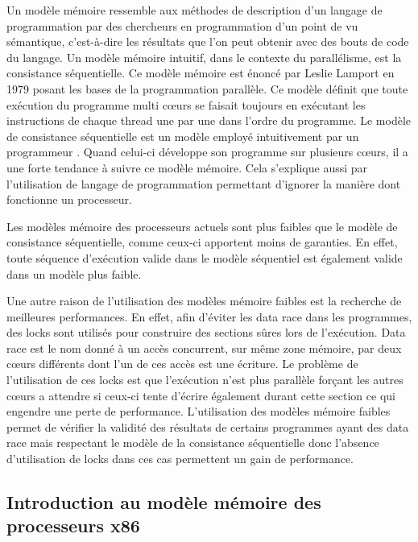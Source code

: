 \documentclass[12pt,a4paper]{article}
\begin{document}
Un modèle mémoire ressemble aux méthodes de description d'un langage de programmation par des chercheurs en programmation d'un point de vu sémantique, c'est-à-dire les résultats que l'on peut obtenir avec des bouts de code du langage. Un modèle mémoire intuitif, dans le contexte du parallélisme, est la consistance séquentielle. Ce modèle mémoire est énoncé par Leslie Lamport en 1979 posant les bases de la programmation parallèle. Ce modèle définit que toute exécution du programme multi cœurs se faisait toujours en exécutant les instructions de chaque thread une par une dans l'ordre du programme. Le modèle de consistance séquentielle est un modèle employé intuitivement par un programmeur \cite{Boehm:2011:YDK:2076796.2088916}. Quand celui-ci développe son programme sur plusieurs cœurs, il a une forte tendance à suivre ce modèle mémoire. Cela s'explique aussi par l'utilisation de langage de programmation permettant d'ignorer la manière dont fonctionne un processeur.  

Les modèles mémoire des processeurs actuels sont plus faibles que le modèle de consistance séquentielle, comme ceux-ci apportent moins de garanties. En effet, toute séquence d'exécution valide dans le modèle séquentiel est également valide dans un modèle plus faible.

Une autre raison de l'utilisation des modèles mémoire faibles est la recherche de meilleures performances. En effet, afin d'éviter les data race dans les programmes, des locks sont utilisés pour construire des sections sûres lors de l'exécution. Data race est le nom donné à un accès concurrent, sur même zone mémoire, par deux cœurs différents dont l'un de ces accès est une écriture. Le problème de l'utilisation de ces locks est que l'exécution n'est plus parallèle forçant les autres cœurs a attendre si ceux-ci tente d'écrire également durant cette section ce qui engendre une perte de performance. L'utilisation des modèles mémoire faibles permet de vérifier la validité des résultats de certains programmes ayant des data race mais respectant le modèle de la consistance séquentielle donc l'absence d'utilisation de locks dans ces cas permettent un gain de performance.

\subsection{Introduction au modèle mémoire des processeurs x86}
 
\end{document}
